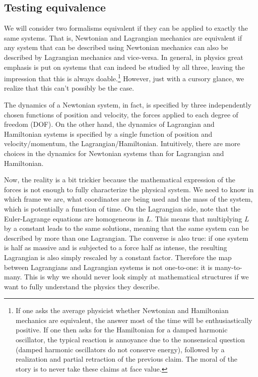 \subsection{Testing equivalence}

We will consider two formalisms equivalent if they can be applied to exactly the same systems. That is, Newtonian and Lagrangian mechanics are equivalent if any system that can be described using Newtonian mechanics can also be described by Lagrangian mechanics and vice-versa. In general, in physics great emphasis is put on systems that can indeed be studied by all three, leaving the impression that this is always doable.\footnote{If one asks the average physicist whether Newtonian and Hamiltonian mechanics are equivalent, the answer most of the time will be  enthusiastically positive. If one then asks for the Hamiltonian for a damped harmonic oscillator, the typical reaction is annoyance due to the nonsensical question (damped harmonic oscillators do not conserve energy), followed by a realization and partial retraction of the previous claim. The moral of the story is to never take these claims at face value.} However, just with a cursory glance, we realize that this can't possibly be the case.

The dynamics of a Newtonian system, in fact, is specified by three independently chosen functions of position and velocity, the forces applied to each degree of freedom (DOF). On the other hand, the dynamics of Lagrangian and Hamiltonian systems is specified by a single function of position and velocity/momentum, the Lagrangian/Hamiltonian. Intuitively, there are more choices in the dynamics for Newtonian systems than for Lagrangian and Hamiltonian.

Now, the reality is a bit trickier because the mathematical expression of the forces is not enough to fully characterize the physical system. We need to know in which frame we are, what coordinates are being used and the mass of the system, which is potentially a function of time. On the Lagrangian side, note that the Euler-Lagrange equations are homogeneous in $L$. This means that multiplying $L$ by a constant leads to the same solutions, meaning that the same system can be described by more than one Lagrangian. The converse is also true: if one system is half as massive and is subjected to a force half as intense, the resulting Lagrangian is also simply rescaled by a constant factor. Therefore the map between Lagrangians and Lagrangian systems is not one-to-one: it is many-to-many. This is why we should never look simply at mathematical structures if we want to fully understand the physics they describe.

